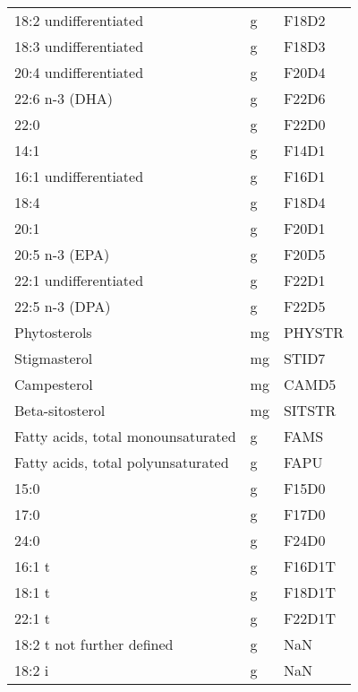\documentclass[]{scrartcl}
\begin{document}
\begin{longtable}{lll}
	18:2 undifferentiated              &     g &       F18D2 \\
	18:3 undifferentiated              &     g &       F18D3 \\
	20:4 undifferentiated              &     g &       F20D4 \\
	22:6 n-3 (DHA)                     &     g &       F22D6 \\
	22:0                               &     g &       F22D0 \\
	14:1                               &     g &       F14D1 \\
	16:1 undifferentiated              &     g &       F16D1 \\
	18:4                               &     g &       F18D4 \\
	20:1                               &     g &       F20D1 \\
	20:5 n-3 (EPA)                     &     g &       F20D5 \\
	22:1 undifferentiated              &     g &       F22D1 \\
	22:5 n-3 (DPA)                     &     g &       F22D5 \\
	Phytosterols                       &    mg &      PHYSTR \\
	Stigmasterol                       &    mg &       STID7 \\
	Campesterol                        &    mg &       CAMD5 \\
	Beta-sitosterol                    &    mg &      SITSTR \\
	Fatty acids, total monounsaturated &     g &        FAMS \\
	Fatty acids, total polyunsaturated &     g &        FAPU \\
	15:0                               &     g &       F15D0 \\
	17:0                               &     g &       F17D0 \\
	24:0                               &     g &       F24D0 \\
	16:1 t                             &     g &      F16D1T \\
	18:1 t                             &     g &      F18D1T \\
	22:1 t                             &     g &      F22D1T \\
	18:2 t not further defined         &     g &         NaN \\
	18:2 i                             &     g &         NaN \\

\end{longtable}
\end{document}
